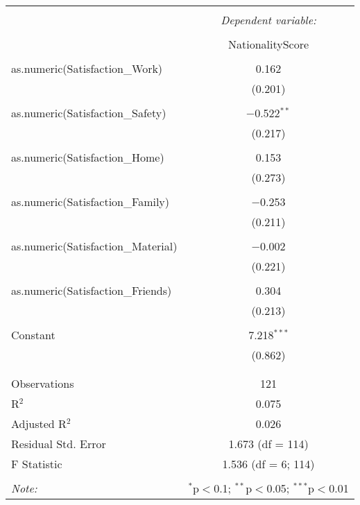 \documentclass{article}
\begin{document}
\begin{table}[!htbp] \centering 
  \caption{} 
  \label{} 
\begin{tabular}{@{\extracolsep{5pt}}lc} 
\\[-1.8ex]\hline 
\hline \\[-1.8ex] 
 & \multicolumn{1}{c}{\textit{Dependent variable:}} \\ 
\cline{2-2} 
\\[-1.8ex] & NationalityScore \\ 
\hline \\[-1.8ex] 
 as.numeric(Satisfaction\_Work) & 0.162 \\ 
  & (0.201) \\ 
  & \\ 
 as.numeric(Satisfaction\_Safety) & $-$0.522$^{**}$ \\ 
  & (0.217) \\ 
  & \\ 
 as.numeric(Satisfaction\_Home) & 0.153 \\ 
  & (0.273) \\ 
  & \\ 
 as.numeric(Satisfaction\_Family) & $-$0.253 \\ 
  & (0.211) \\ 
  & \\ 
 as.numeric(Satisfaction\_Material) & $-$0.002 \\ 
  & (0.221) \\ 
  & \\ 
 as.numeric(Satisfaction\_Friends) & 0.304 \\ 
  & (0.213) \\ 
  & \\ 
 Constant & 7.218$^{***}$ \\ 
  & (0.862) \\ 
  & \\ 
\hline \\[-1.8ex] 
Observations & 121 \\ 
R$^{2}$ & 0.075 \\ 
Adjusted R$^{2}$ & 0.026 \\ 
Residual Std. Error & 1.673 (df = 114) \\ 
F Statistic & 1.536 (df = 6; 114) \\ 
\hline 
\hline \\[-1.8ex] 
\textit{Note:}  & \multicolumn{1}{r}{$^{*}$p$<$0.1; $^{**}$p$<$0.05; $^{***}$p$<$0.01} \\ 
\end{tabular} 
\end{table} 
\end{document}
